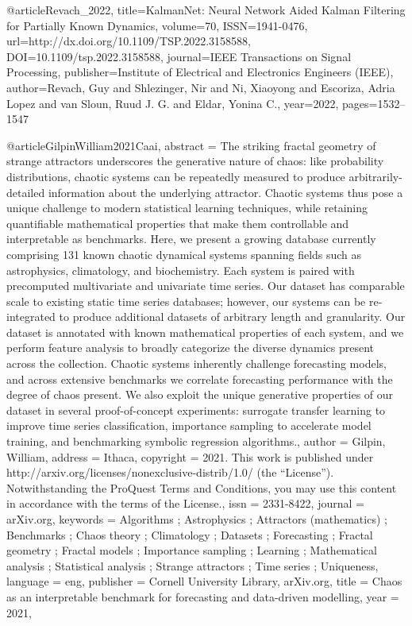 @article{Revach_2022,
   title={KalmanNet: Neural Network Aided Kalman Filtering for Partially Known Dynamics},
   volume={70},
   ISSN={1941-0476},
   url={http://dx.doi.org/10.1109/TSP.2022.3158588},
   DOI={10.1109/tsp.2022.3158588},
   journal={IEEE Transactions on Signal Processing},
   publisher={Institute of Electrical and Electronics Engineers (IEEE)},
   author={Revach, Guy and Shlezinger, Nir and Ni, Xiaoyong and Escoriza, Adria Lopez and van Sloun, Ruud J. G. and Eldar, Yonina C.},
   year={2022},
   pages={1532–1547} }

@article{GilpinWilliam2021Caai,
abstract = {The striking fractal geometry of strange attractors underscores the generative nature of chaos: like probability distributions, chaotic systems can be repeatedly measured to produce arbitrarily-detailed information about the underlying attractor. Chaotic systems thus pose a unique challenge to modern statistical learning techniques, while retaining quantifiable mathematical properties that make them controllable and interpretable as benchmarks. Here, we present a growing database currently comprising 131 known chaotic dynamical systems spanning fields such as astrophysics, climatology, and biochemistry. Each system is paired with precomputed multivariate and univariate time series. Our dataset has comparable scale to existing static time series databases; however, our systems can be re-integrated to produce additional datasets of arbitrary length and granularity. Our dataset is annotated with known mathematical properties of each system, and we perform feature analysis to broadly categorize the diverse dynamics present across the collection. Chaotic systems inherently challenge forecasting models, and across extensive benchmarks we correlate forecasting performance with the degree of chaos present. We also exploit the unique generative properties of our dataset in several proof-of-concept experiments: surrogate transfer learning to improve time series classification, importance sampling to accelerate model training, and benchmarking symbolic regression algorithms.},
author = {Gilpin, William},
address = {Ithaca},
copyright = {2021. This work is published under http://arxiv.org/licenses/nonexclusive-distrib/1.0/ (the “License”). Notwithstanding the ProQuest Terms and Conditions, you may use this content in accordance with the terms of the License.},
issn = {2331-8422},
journal = {arXiv.org},
keywords = {Algorithms ; Astrophysics ; Attractors (mathematics) ; Benchmarks ; Chaos theory ; Climatology ; Datasets ; Forecasting ; Fractal geometry ; Fractal models ; Importance sampling ; Learning ; Mathematical analysis ; Statistical analysis ; Strange attractors ; Time series ; Uniqueness},
language = {eng},
publisher = {Cornell University Library, arXiv.org},
title = {Chaos as an interpretable benchmark for forecasting and data-driven modelling},
year = {2021},
}

